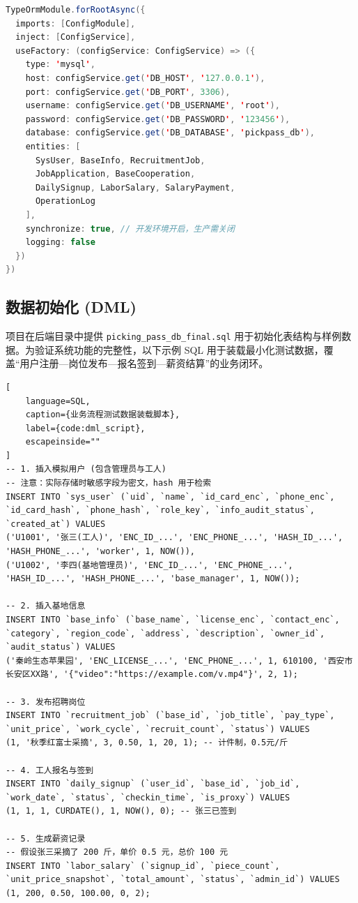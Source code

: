 \documentclass[UTF8,a4paper,12pt]{article}
\begin{document}
\begin{lstlisting}[language=Java, caption={TypeORM 数据库连接配置 (app.module.ts)}, label={code:db_config}]
TypeOrmModule.forRootAsync({
  imports: [ConfigModule],
  inject: [ConfigService],
  useFactory: (configService: ConfigService) => ({
    type: 'mysql',
    host: configService.get('DB_HOST', '127.0.0.1'),
    port: configService.get('DB_PORT', 3306),
    username: configService.get('DB_USERNAME', 'root'),
    password: configService.get('DB_PASSWORD', '123456'),
    database: configService.get('DB_DATABASE', 'pickpass_db'),
    entities: [
      SysUser, BaseInfo, RecruitmentJob,
      JobApplication, BaseCooperation,
      DailySignup, LaborSalary, SalaryPayment,
      OperationLog
    ],
    synchronize: true, // 开发环境开启，生产需关闭
    logging: false
  })
})
\end{lstlisting}

\subsection{数据初始化 (DML)}
项目在后端目录中提供 \texttt{picking\_pass\_db\_final.sql} 用于初始化表结构与样例数据。为验证系统功能的完整性，以下示例 SQL 用于装载最小化测试数据，覆盖“用户注册—岗位发布—报名签到—薪资结算”的业务闭环。

\begin{lstlisting}[
    language=SQL, 
    caption={业务流程测试数据装载脚本}, 
    label={code:dml_script},
    escapeinside=""
]
-- 1. 插入模拟用户 (包含管理员与工人)
-- 注意：实际存储时敏感字段为密文，hash 用于检索
INSERT INTO `sys_user` (`uid`, `name`, `id_card_enc`, `phone_enc`, `id_card_hash`, `phone_hash`, `role_key`, `info_audit_status`, `created_at`) VALUES
('U1001', '张三(工人)', 'ENC_ID_...', 'ENC_PHONE_...', 'HASH_ID_...', 'HASH_PHONE_...', 'worker', 1, NOW()),
('U1002', '李四(基地管理员)', 'ENC_ID_...', 'ENC_PHONE_...', 'HASH_ID_...', 'HASH_PHONE_...', 'base_manager', 1, NOW());

-- 2. 插入基地信息
INSERT INTO `base_info` (`base_name`, `license_enc`, `contact_enc`, `category`, `region_code`, `address`, `description`, `owner_id`, `audit_status`) VALUES
('秦岭生态苹果园', 'ENC_LICENSE_...', 'ENC_PHONE_...', 1, 610100, '西安市长安区XX路', '{"video":"https://example.com/v.mp4"}', 2, 1);

-- 3. 发布招聘岗位
INSERT INTO `recruitment_job` (`base_id`, `job_title`, `pay_type`, `unit_price`, `work_cycle`, `recruit_count`, `status`) VALUES
(1, '秋季红富士采摘', 3, 0.50, 1, 20, 1); -- 计件制，0.5元/斤

-- 4. 工人报名与签到
INSERT INTO `daily_signup` (`user_id`, `base_id`, `job_id`, `work_date`, `status`, `checkin_time`, `is_proxy`) VALUES
(1, 1, 1, CURDATE(), 1, NOW(), 0); -- 张三已签到

-- 5. 生成薪资记录
-- 假设张三采摘了 200 斤，单价 0.5 元，总价 100 元
INSERT INTO `labor_salary` (`signup_id`, `piece_count`, `unit_price_snapshot`, `total_amount`, `status`, `admin_id`) VALUES
(1, 200, 0.50, 100.00, 0, 2);
\end{lstlisting}
\end{document}
